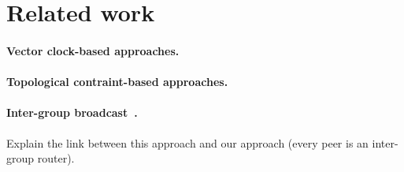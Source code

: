 
\section{Related work}
\label{sec:relatedwork}


\paragraph{Vector clock-based approaches.}
\paragraph{Topological contraint-based approaches.}

\paragraph{Inter-group
  broadcast~\cite{johnson1998scalable,johnson1999intergroup}.} Explain the link
between this approach and our approach (every peer is an inter-group router).


